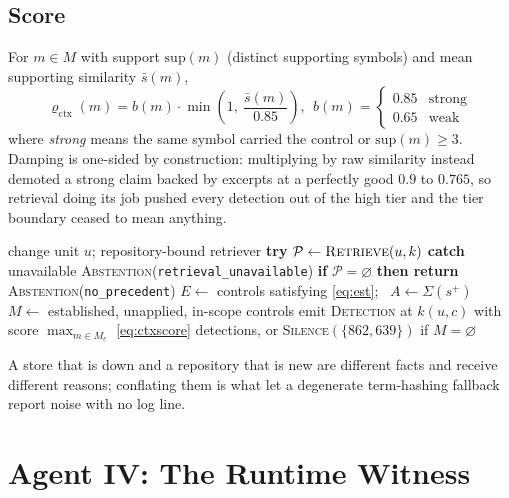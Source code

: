 \documentclass[conference]{IEEEtran}
\newcommand{\Unit}{u}
\begin{document}
\subsection{Score}
For $m \in M$ with support $\mathrm{sup}(m)$ (distinct supporting symbols) and mean
supporting similarity $\bar{s}(m)$,
\begin{equation}
\varrho_{\mathrm{ctx}}(m) = b(m)\cdot\min\!\left(1,\ \frac{\bar{s}(m)}{0.85}\right),\ \
b(m)=\begin{cases}0.85 & \text{strong}\\ 0.65 & \text{weak}\end{cases}
\label{eq:ctxscore}
\end{equation}
where \emph{strong} means the same symbol carried the control or $\mathrm{sup}(m) \ge 3$.
Damping is one-sided by construction: multiplying by raw similarity instead demoted a strong
claim backed by excerpts at a perfectly good $0.9$ to $0.765$, so retrieval doing its job
pushed every detection out of the high tier and the tier boundary ceased to mean anything.

\begin{algorithm}[t]
\caption{\textsc{ContextRAG}$(\Unit)$}
\label{alg:ctx}
\begin{algorithmic}[1]
\Require change unit $\Unit$; repository-bound retriever
\State \textbf{try} $\mathcal{P} \gets \textsc{Retrieve}(\Unit, k)$ \textbf{catch} unavailable
  \State \quad \Return \textsc{Abstention}(\texttt{retrieval\_unavailable})
\State \textbf{if} $\mathcal{P}=\varnothing$ \textbf{then return} \textsc{Abstention}(\texttt{no\_precedent})
\State $E \gets$ controls satisfying \eqref{eq:est}; \ $A \gets \Sigma(s^{+})$
\State $M \gets$ established, unapplied, in-scope controls
  \State emit \textsc{Detection} at $k(\Unit,c)$ with score $\max_{m \in M_c}$ \eqref{eq:ctxscore}
\EndFor
\State \Return detections, or \textsc{Silence}$(\{\text{862},\text{639}\})$ if $M=\varnothing$
\end{algorithmic}
\end{algorithm}

A store that is down and a repository that is new are different facts and receive different
reasons; conflating them is what let a degenerate term-hashing fallback report noise with no
log line.

\section{Agent IV: The Runtime Witness}
\end{document}
